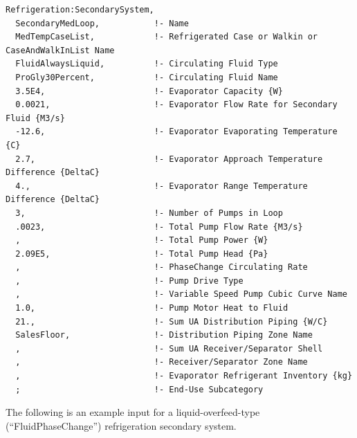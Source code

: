 \begin{lstlisting}
Refrigeration:SecondarySystem,
  SecondaryMedLoop,           !- Name
  MedTempCaseList,            !- Refrigerated Case or Walkin or CaseAndWalkInList Name
  FluidAlwaysLiquid,          !- Circulating Fluid Type
  ProGly30Percent,            !- Circulating Fluid Name
  3.5E4,                      !- Evaporator Capacity {W}
  0.0021,                     !- Evaporator Flow Rate for Secondary Fluid {M3/s}
  -12.6,                      !- Evaporator Evaporating Temperature {C}
  2.7,                        !- Evaporator Approach Temperature Difference {DeltaC}
  4.,                         !- Evaporator Range Temperature Difference {DeltaC}
  3,                          !- Number of Pumps in Loop
  .0023,                      !- Total Pump Flow Rate {M3/s}
  ,                           !- Total Pump Power {W}
  2.09E5,                     !- Total Pump Head {Pa}
  ,                           !- PhaseChange Circulating Rate
  ,                           !- Pump Drive Type
  ,                           !- Variable Speed Pump Cubic Curve Name
  1.0,                        !- Pump Motor Heat to Fluid
  21.,                        !- Sum UA Distribution Piping {W/C}
  SalesFloor,                 !- Distribution Piping Zone Name
  ,                           !- Sum UA Receiver/Separator Shell
  ,                           !- Receiver/Separator Zone Name
  ,                           !- Evaporator Refrigerant Inventory {kg}
  ;                           !- End-Use Subcategory
\end{lstlisting}

The following is an example input for a liquid-overfeed-type (``FluidPhaseChange'') refrigeration secondary system.

